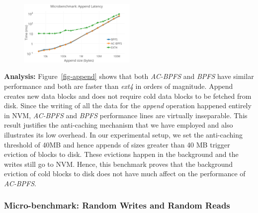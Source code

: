 \begin{figure}
\centering
\vspace{-0.1in}
\includegraphics[width=0.5\textwidth]{figs/append.png}
\vspace{-0.1in}
\end{figure}

\textbf{Analysis:} Figure~\ref{fig-append} shows that both \textit{AC-BPFS} and \textit{BPFS} have similar performance and both are faster than \textit{ext4} in orders of magnitude. Append creates new data blocks and does not require cold data blocks to be fetched from disk. Since the writing of all the data for the \textit{append} operation happened entirely in NVM, \textit{AC-BPFS} and \textit{BPFS} performance lines are virtually inseparable. This result justifies the anti-caching mechanism that we have employed and also illustrates its low overhead. In our experimental setup, we set the anti-caching threshold of 40MB and hence appends of sizes greater than 40 MB trigger eviction of blocks to disk. These evictions happen in the background and the writes still go to NVM. Hence, this benchmark proves that the background eviction of cold blocks to disk does not have much affect on the performance of \textit{AC-BPFS}.

\subsubsection{Micro-benchmark: Random Writes and Random Reads}

